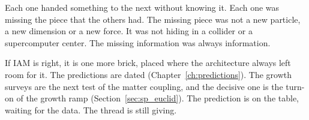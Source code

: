 Each one handed something to the next without knowing it. Each one was missing the piece that the others had. The missing piece was not a
new particle, a new dimension or a new force. It was not hiding in a collider or a supercomputer center. The missing information was always
information.

If IAM is right, it is one more brick, placed where the architecture always left room for it. The predictions are dated
(Chapter~\ref{ch:predictions}). The growth surveys are the next test of the matter coupling, and the decisive one is the turn-on of the growth ramp
(Section~\ref{sec:sp_euclid}). \prediction{} The prediction is on the table, waiting
for the data. The thread is still giving.
